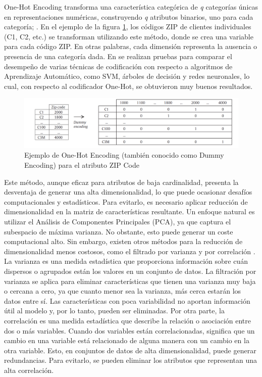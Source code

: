 One-Hot Encoding transforma una característica categórica de \textit{q} categorías únicas en representaciones numéricas, construyendo \textit{q} atributos binarios, uno para cada categoría; \citep{avanzi2023machine}. En el ejemplo de la figura \ref{fig:one-hot-ejemplo}, los códigos ZIP de clientes individuales (C1, C2, etc.) se transforman utilizando este método, donde se crea una variable  para cada código ZIP.
En otras palabras, cada dimensión representa la ausencia o presencia de una categoría dada. En \citep{hooi2022feature} se realizan pruebas para comparar el desempeño de varias técnicas de codificación con respecto a algoritmos de Aprendizaje Automático, como SVM, árboles de decisión y redes neuronales, lo cual, con respecto al codificador One-Hot, se obtuvieron muy buenos resultados. \\
\begin{figure}[H]
	\centering
	\includegraphics[width=0.8\linewidth]{"figuras/capi 1/one-hot-ejemplo"}
	\caption{Ejemplo de One-Hot Encoding (también conocido como Dummy Encoding) para el atributo ZIP Code}
	\label{fig:one-hot-ejemplo}
\end{figure}
Este método, aunque eficaz para atributos de baja cardinalidad, presenta la desventaja de generar una alta dimensionalidad, lo que puede ocasionar desafíos computacionales y estadísticos. Para evitarlo, es necesario aplicar reducción de dimensionalidad en la matriz de características resultante. Un enfoque natural es utilizar el Análisis de Componentes Principales (PCA), ya que captura el subespacio de máxima varianza. No obstante, esto puede generar un coste computacional alto. Sin embargo, existen otros métodos para la reducción de dimensionalidad menos costosos, como el filtrado por varianza \citep{domingos2012few} y por correlación \citep{chandrashekar2014survey}. \\
La varianza es una medida estadística que proporciona información sobre cuán dispersos o agrupados están los valores en un conjunto de datos. La filtración por varianza se aplica para eliminar características que tienen una varianza muy baja o cercana a cero, ya que cuanto menor sea la varianza, más cerca estarán los datos entre sí. Las características con poca variabilidad no aportan información útil al modelo y, por lo tanto, pueden ser eliminadas. Por otra parte, la correlación es una medida estadística que describe la relación o asociación entre dos o más variables. Cuando dos variables están correlacionadas, significa que un cambio en una variable está relacionado de alguna manera con un cambio en la otra variable. Esto, en conjuntos de datos de alta dimensionalidad, puede generar redundancias. Para evitarlo, se pueden eliminar los atributos que representan una alta correlación. \\
